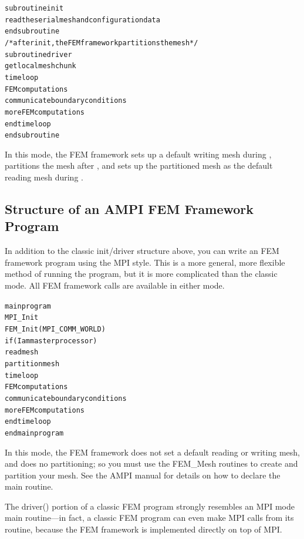 \documentclass[10pt]{article}
\begin{document}
\begin{alltt}
     subroutine init
          read the serial mesh and configuration data
     end subroutine
/* after init, the FEM framework partitions the mesh */
     subroutine driver
          get local mesh chunk
          time loop
               FEM computations
               communicate boundary conditions
               more FEM computations
          end time loop
     end subroutine
\end{alltt}

In this mode, the FEM framework sets up a default writing
mesh during , partitions the mesh after ,
and sets up the partitioned mesh as the default reading mesh 
during . 


\subsection{Structure of an AMPI FEM Framework Program}

In addition to the classic init/driver structure above,
you can write an FEM framework program using the MPI style.
This is a more general, more flexible method of running
the program, but it is more complicated than the classic mode.
All FEM framework calls are available in either mode.

\begin{alltt}
   main program
      MPI_Init
      FEM_Init(MPI_COMM_WORLD)
      if (I am master processor)
         read mesh
      partition mesh
      time loop
          FEM computations
          communicate boundary conditions
          more FEM computations
      end time loop
   end main program
\end{alltt}

In this mode, the FEM framework does not set a default
reading or writing mesh, and does no partitioning;
so you must use the FEM\_Mesh routines to create and 
partition your mesh.
See the AMPI manual for details on how to declare
the main routine.

The driver() portion of a classic FEM program
strongly resembles an MPI mode main routine---in fact, a classic
FEM program can even make MPI calls from its  
routine, because the FEM framework is implemented directly on
top of MPI.  
\end{document}
